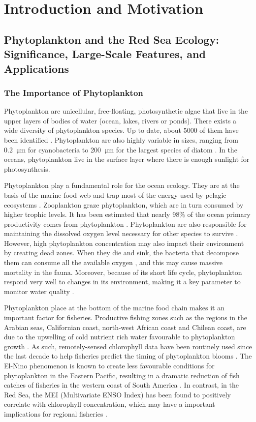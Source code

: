 \chapter{Introduction and Motivation}

\section{Phytoplankton and the Red Sea Ecology: Significance, Large-Scale
Features, and Applications}

\subsection{The Importance of Phytoplankton}

Phytoplankton are unicellular, free-floating, photosynthetic algae that live in
the upper layers of bodies of water (ocean, lakes, rivers or ponds). There
exists a wide diversity of phytoplankton species. Up to date, about 5000 of
them have been identified \citep{Tett1995}. Phytoplankton are also highly
variable in sizes, ranging from \SI{0.2}{\micro\metre} for cyanobacteria to
\SI{200}{\micro\metre} for the largest species of diatom \citep{Pal2014}. In
the oceans, phytoplankton live in the surface layer where there is enough
sunlight for photosynthesis. 

Phytoplankton play a fundamental role for the ocean ecology. They are at the
basis of the marine food web and trap most of the energy used by pelagic
ecosystems \citep{Pal2014}. Zooplankton graze phytoplankton, which are in turn
consumed by higher trophic levels. It has been estimated that nearly 98\% of
the ocean primary productivity comes from phytoplankton \citep{Pal2014}.
Phytoplankton are also responsible for maintaining the dissolved oxygen level
necessary for other species to survive \citep{Pal2014}.  However, high
phytoplankton concentration may also impact their environment by creating dead
zones. When they die and sink, the bacteria that decompose them can consume all
the available oxygen \citep{Pal2014}, and this may cause massive mortality in
the fauna. Moreover, because of its short life cycle, phytoplankton respond
very well to changes in its environment, making it a key parameter to monitor
water quality \citep{Wu2014}.

Phytoplankton place at the bottom of the marine food chain makes it an
important factor for fisheries. Productive fishing zones such as the regions in
the Arabian seas, Californian coast, north-west African coast and Chilean
coast, are due to the upwelling of cold nutrient rich water favourable to
phytoplankton growth \citep{Mann2006}.  As such, remotely-sensed chlorophyll
data have been routinely used since the last decade to help fisheries predict
the timing of phytoplankton blooms \citep{Robinson2010}. The El-Nino phenomenon
is known to create less favourable conditions for phytoplankton in the Eastern
Pacific, resulting in a dramatic reduction of fish catches of fisheries in the
western coast of South America \citep{Robinson2010}. In contrast, in the Red
Sea, the MEI (Multivariate ENSO Index) has been found to positively correlate
with chlorophyll concentration, which may have a important implications for
regional fisheries \citep{Raitsos2015}.

